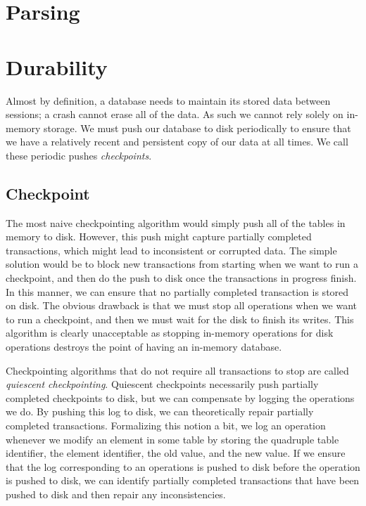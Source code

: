 \documentclass[10pt]{article}
\begin{document}
\begin{multicols}{2}
\section{Parsing}

\section{Durability}
Almost by definition, a database needs to maintain its stored data between sessions; a crash cannot erase all of the data. As such we cannot rely solely on in-memory storage. We must push our database to disk periodically to ensure that we have a relatively recent and persistent copy of our data at all times. We call these periodic pushes \textit{checkpoints}.

\subsection{Checkpoint}
The most naive checkpointing algorithm would simply push all of the tables in memory to disk. However, this push might capture partially completed transactions, which might lead to inconsistent or corrupted data. The simple solution would be to block new transactions from starting when we want to run a checkpoint, and then do the push to disk once the transactions in progress finish. In this manner, we can ensure that no partially completed transaction is stored on disk. The obvious drawback is that we must stop all operations when we want to run a checkpoint, and then we must wait for the disk to finish its writes. This algorithm is clearly unacceptable as stopping in-memory operations for disk operations destroys the point of having an in-memory database.

Checkpointing algorithms that do not require all transactions to stop are called \textit{quiescent checkpointing}. Quiescent checkpoints necessarily push partially completed checkpoints to disk, but we can compensate by logging the operations we do. By pushing this log to disk, we can theoretically repair partially completed transactions. Formalizing this notion a bit, we log an operation whenever we modify an element in some table by storing the quadruple table identifier, the element identifier, the old value, and the new value. If we ensure that the log corresponding to an operations is pushed to disk before the operation is pushed to disk, we can identify partially completed transactions that have been pushed to disk and then repair any inconsistencies.


\end{multicols}
\end{document}
